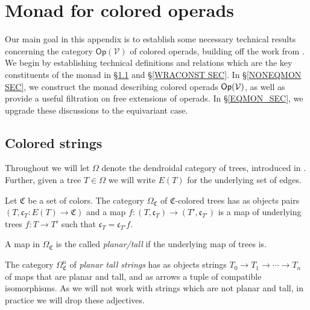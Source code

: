 \documentclass[a4paper,10pt
,draft
]{article}%
\renewcommand{\1}{\eta}%
\begin{document}
\newpage



\appendix


\section{Monad for colored operads}
\label{MONAD_APDX}


Our main goal in this appendix is to establish some necessary technical results concerning the category $\mathsf{Op}(\mathcal{V})$ of colored operads,
building off the work from \cite{BP_geo}.
We begin by establishing technical definitions and relations which are the key constituents of the monad in \S \ref{CSTRINGS_SEC} and \S \ref{WRACONST SEC}.
In \S \ref{NONEQMON SEC}, we construct the monad describing colored operads $\mathsf{Op}(\mathcal V)$, as well as provide a useful filtration on free extensions of operads.
In \S \ref{EQMON_SEC}, we upgrade these discussions to the equivariant case.




\subsection{Colored strings}
\label{CSTRINGS_SEC}


Throughout we will let $\Omega$ denote the dendroidal category of trees, introduced in \cite{MW07}.
Further, given a tree $T\in \Omega$ we will write 
$E(T)$ for the underlying set of edges.

\begin{definition}
Let $\mathfrak{C}$ be a set of colors.
The category $\Omega_{\mathfrak{C}}$ of $\mathfrak{C}$-colored trees has as objects pairs
$(T,\mathfrak{c}_T\colon E(T) \to \mathfrak{C})$ and a map
$f\colon (T,\mathfrak{c}_T) \to (T',\mathfrak{c}_{T'})$
is a map of underlying trees $f\colon T \to T'$
such that $\mathfrak{c}_T = \mathfrak{c}_{T'} f$.

A map in $\Omega_{\mathfrak{C}}$ is the called \textit{planar/tall} if the underlying map of trees is.

The category $\Omega_{\mathfrak{C}}^n$ of \textit{planar tall strings} has as objects strings $T_0 \to T_1 \to \cdots \to T_n$ of maps that are planar and tall, and as arrows a tuple of compatible isomorphisms.
As we will not work with strings which are not planar and tall, in practice we will drop these adjectives.
\end{definition}
\end{document}
